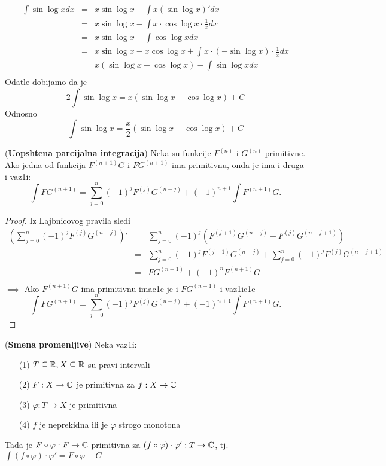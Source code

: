 \documentclass[../main.tex]{subfiles}
\begin{document}
\begin{pr}
\begin{eqnarray*}
 \int \sin \log x dx &=& x \sin \log x - \int x (\sin \log x)' dx\\ 
 &=& x\sin \log x - \int x \cdot \cos \log x \cdot \frac{1}{x}dx \\
 &=& x\sin \log x - \int \cos \log x  dx \\
 &=& x\sin \log x - x \cos \log x + \int x \cdot (-\sin \log x) \cdot \frac{1}{x}dx \\
 &=& x(\sin \log x -  \cos \log x) - \int \sin \log x  dx \\
\end{eqnarray*}
Odatle dobijamo da je
$$2 \int \sin \log x = x(\sin \log x -  \cos \log x) + C$$
Odnosno
$$\int \sin \log x = \frac{x}{2}(\sin \log x - \cos \log x) + C$$
\end{pr}
\begin{tvr}
(\textbf{Uopshtena parcijalna integracija}) Neka su funkcije $F^{(n)}$
i $G^{(n)}$ primitivne. Ako jedna od funkcija $F^{(n+1)}G$ i $FG^{(n+1)}$
ima primitivnu, onda je ima i druga i vaz1i:
$$\int FG^{(n+1)} = \sum_{j=0}^{n} (-1)^j F^{(j)} G^{(n-j)} + (-1)^{n+1} \int F^{(n+1)} G.$$
\end{tvr}
\begin{proof}
Iz Lajbnicovog pravila sledi
\begin{eqnarray*}
 \left(\sum_{j=0}^n(-1)^jF^{(j)}G^{(n-j)}\right)' &=& \sum_{j=0}^n(-1)^j\left(F^{(j+1)}G^{(n-j)}+F^{(j)}G^{(n-j+1)}\right)\\ 
 &=& \sum_{j=0}^n(-1)^j F^{(j+1)}G^{(n-j)}+\sum_{j=0}^n(-1)^j F^{(j)}G^{(n-j+1)}\\
 &=& FG^{(n+1)}+(-1)^n F^{(n+1)}G \\
\end{eqnarray*}
$\implies$ Ako $F^{(n+1)}G$ ima primitivnu imac1e je i $FG^{(n+1)}$ i
vaz1ic1e
$$\int FG^{(n+1)} = \sum_{j=0}^{n} (-1)^j F^{(j)} G^{(n-j)} + (-1)^{n+1} \int F^{(n+1)} G.$$
\end{proof}
\begin{tvr}
(\textbf{Smena promenljive}) Neka vaz1i:
\begin{itemize}
        \item[(1)] $T\subseteq \mathbb{R}, X\subseteq \mathbb{R}$ su pravi intervali
        \item[(2)] $F:X \to \mathbb{C}$ je primitivna za $f:X\to \mathbb{C}$
        \item[(3)] $\varphi:T\to X$ je primitivna
        \item[(4)] $f$ je neprekidna ili je $\varphi$ strogo monotona
\end{itemize}
Tada je $F\circ \varphi:F\to \mathbb{C}$ primitivna za $(f\circ \varphi)\cdot \varphi':T\to \mathbb{C}$, tj. $\int(f\circ \varphi)\cdot \varphi'=F\circ \varphi +C$
\end{tvr}
\end{document}

